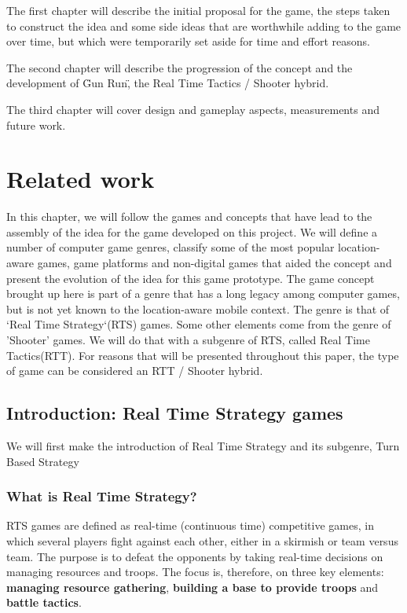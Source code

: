 \documentclass{article}
\begin{document}
The first chapter will describe the initial proposal for the game, the steps
taken to construct the idea and some side ideas that are worthwhile adding to
the game over time, but which were temporarily set aside for time and effort
reasons.\newline

The second chapter will describe the progression of the concept and the
development of \"Gun Run\", the Real Time Tactics / Shooter
hybrid.\newline

The third chapter will cover design and gameplay aspects, measurements and
future work.\newline

\section{Related work}

In this chapter, we will follow the games and concepts that have lead to the
assembly of the idea for the game developed on this project. We will define a
number of computer game genres, classify some of the most popular location-aware
games, game platforms and non-digital games that aided the concept and present
the evolution of the idea for this game prototype. The game concept brought up
here is part of a genre that has a long legacy among computer games, but is not
yet known to the location-aware mobile context. The genre is that of `Real
Time Strategy`(RTS)\cite{rts} games. Some other elements come from the genre of
'Shooter' games\cite{shooter}. We will do that with a subgenre of RTS, called
Real Time Tactics(RTT)\cite{rttvsrts}. For reasons that will be presented
throughout this paper, the type of game can be considered an RTT / Shooter
hybrid. \newline


\subsection{Introduction: Real Time Strategy games}

We will first make the introduction of Real Time Strategy and its subgenre, Turn
Based Strategy

\subsubsection{What is Real Time Strategy?}

RTS games are defined as real-time (continuous time) competitive games, in which
several players fight against each other, either in a skirmish or team versus
team. The purpose is to defeat the opponents by taking real-time decisions on
managing resources and troops. The focus is, therefore, on three key elements:
\textbf{managing resource gathering}, \textbf{building a base to provide troops}
and \textbf{battle tactics}.\cite{rts}\newline
\end{document}
